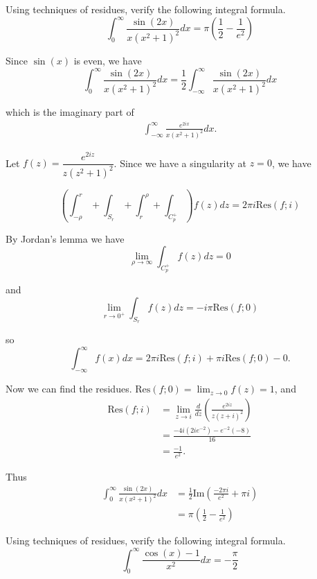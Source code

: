 \documentclass[12pt]{article}
\author{Warren Atkison}
\date{\today}
\newenvironment{exercise}[2][Exercise]{\begin{trivlist}
\item[\hskip \labelsep {\bfseries #1} \hskip \labelsep {\bfseries #2.}]}{\end{trivlist}}
\begin{document}
\fancyhf{}
\fancyhead[R]{\today}
\fancyfoot[R]{\thepage}

\begin{exercise}{4}
	Using techniques of residues, verify the following integral formula.
	\[
		\int_{0}^{\infty} \frac{\sin(2x)}{x(x^2 + 1)^2}dx = \pi\left(\frac{1}{2}-\frac{1}{e^2}\right)
	\]
\end{exercise}

Since $\sin(x)$ is even, we have
\[
	\int_{0}^{\infty} \frac{\sin(2x)}{x(x^2 + 1)^2}dx = \frac{1}{2}\int_{-\infty}^{\infty} \frac{\sin(2x)}{x(x^2 + 1)^2}dx
\]

which is the imaginary part of
\begin{align*}
	\int_{-\infty}^{\infty} \frac{e^{2ix}}{x(x^2 + 1)^2}dx.
\end{align*}

Let $f(z) = \dfrac{e^{2iz}}{z(z^2 + 1)^2}$. Since we have a singularity at $z = 0$, we have

\[
	\left(\int_{-\rho}^{r} + \int_{S_r} + \int_{r}^{\rho} + \int_{C_p^{+}}\right)f(z)dz = 2\pi i \text{Res}(f; i)
\]

By Jordan's lemma we have
\[
	\lim_{\rho \to \infty}\int_{C_p^{+}}f(z)dz = 0
\]

and
\[
	\lim_{r \to 0^{+}}\int_{S_r}f(z)dz = -i\pi \text{Res}(f; 0)
\]

so
\[
	\int_{-\infty}^{\infty} f(x)dx = 2\pi i\text{Res}(f; i) + \pi i \text{Res}(f; 0) - 0.
\]

Now we can find the residues. $\text{Res}(f; 0) = \lim_{z \to 0} f(z) = 1$, and
\begin{align*}
	\text{Res}(f; i) &= \lim_{z \to i} \frac{d}{dz}\left(\frac{e^{2iz}}{z(z + i)^2}\right) \\
			 &= \frac{-4i(2ie^{-2}) - e^{-2}(-8)}{16} \\
			 &= \frac{-1}{e^2}.
\end{align*}

Thus
\begin{align*}
	\int_{0}^{\infty} \frac{\sin(2x)}{x(x^2+1)^2}dx &= \frac{1}{2}\text{Im}\left(\frac{-2\pi i}{e^2} + \pi i\right) \\
							&= \pi\left(\frac{1}{2} - \frac{1}{e^2}\right)
\end{align*}

\begin{exercise}{5}
	Using techniques of residues, verify the following integral formula.
	\[
		\int_{0}^{\infty} \frac{\cos(x) - 1}{x^2}dx = -\frac{\pi}{2}
	\]
\end{exercise}	
\end{document}
